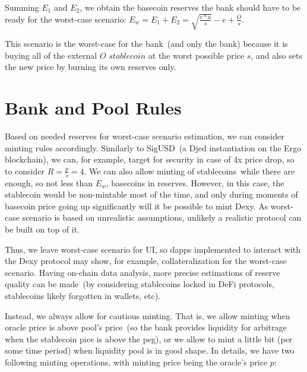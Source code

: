 \documentclass[a4paper,UKenglish,cleveref, autoref, thm-restate]{lipics-v2021}
\newcommand{\sct}{stablecoin}
\newcommand{\dx}{Dexy}
\begin{document}
Summing $E_1$ and $E_2$, we obtain the basecoin reserves the bank should have to be ready for the worst-case scenario: $E_w = E_1 + E_2 = \sqrt{\frac{e * u}{s}} - e + \frac{O}{s}$.

This scenario is the worst-case for the bank~(and only the bank) because it is buying all of the external $O$ $\sct{}$ at the worst possible price $s$, and also sets the new price by burning its own reserves only.  

\section{Bank and Pool Rules}
\label{sec:detailed-rules}

Based on needed reserves for worst-case scenario estimation, we can consider minting rules accordingly. Similarly to SigUSD~(a Djed instantiation on the Ergo blockchain), we can, for example, target for security in case of 
4x price drop, so to consider $R = \frac{p}{s} = 4$. 
We can also allow minting of \sct{}s~while there are enough, so not less than $E_w$, basecoins in reserves. However, in this case, the \sct{} would be non-mintable most of the time, and only during moments of basecoin price going up significantly will it be possible to mint \dx{}. As worst-case scenario is based on unrealistic assumptions, unlikely a realistic protocol can be built on top of it.  

Thus, we leave worst-case scenario for UI, so dapps implemented to interact with the \dx{} protocol may show, for example, collateralization for the worst-case scenario. Having on-chain data analysis, more precise estimations of reserve quality can be made~(by considering \sct{}s locked in DeFi protocols, stablecoins likely forgotten in wallets, etc).

Instead, we always allow for cautious minting. That is, we allow minting when oracle price is above pool's price~(so the bank provides liquidity for arbitrage when the \sct{} pice is above the peg), or we allow to mint a little bit (per some time period) when liquidity pool is in good shape. In details, we have two following minting operations, with minting price being the oracle's price $p$:  
\end{document}
